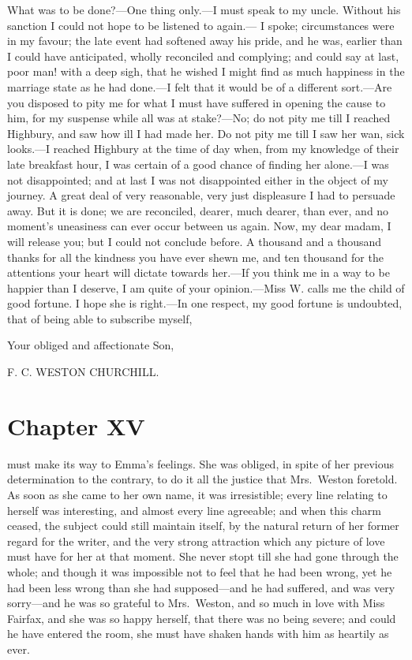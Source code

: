 What was to be done?---One thing only.---I must speak to my uncle.
Without his sanction I could not hope to be listened to again.---%
I spoke; circumstances were in my favour; the late event had softened
away his pride, and he was, earlier than I could have anticipated,
wholly reconciled and complying; and could say at last, poor man!
with a deep sigh, that he wished I might find as much happiness
in the marriage state as he had done.---I felt that it would be
of a different sort.---Are you disposed to pity me for what I must
have suffered in opening the cause to him, for my suspense while
all was at stake?---No; do not pity me till I reached Highbury,
and saw how ill I had made her.  Do not pity me till I saw her wan,
sick looks.---I reached Highbury at the time of day when, from my
knowledge of their late breakfast hour, I was certain of a good chance
of finding her alone.---I was not disappointed; and at last I was
not disappointed either in the object of my journey.  A great deal
of very reasonable, very just displeasure I had to persuade away.
But it is done; we are reconciled, dearer, much dearer, than ever,
and no moment's uneasiness can ever occur between us again.  Now, my
dear madam, I will release you; but I could not conclude before.
A thousand and a thousand thanks for all the kindness you have
ever shewn me, and ten thousand for the attentions your heart
will dictate towards her.---If you think me in a way to be happier
than I deserve, I am quite of your opinion.---Miss W. calls me
the child of good fortune.  I hope she is right.---In one respect,
my good fortune is undoubted, that of being able to subscribe
myself,

                    Your obliged and affectionate Son,

                                          F. C. WESTON CHURCHILL.



\chapter{Chapter XV}


 must make its way to Emma's feelings.  She was obliged,
in spite of her previous determination to the contrary, to do
it all the justice that Mrs.\ Weston foretold.  As soon as she
came to her own name, it was irresistible; every line relating
to herself was interesting, and almost every line agreeable;
and when this charm ceased, the subject could still maintain itself,
by the natural return of her former regard for the writer, and the
very strong attraction which any picture of love must have for her at
that moment.  She never stopt till she had gone through the whole;
and though it was impossible not to feel that he had been wrong,
yet he had been less wrong than she had supposed---and he had suffered,
and was very sorry---and he was so grateful to Mrs.\ Weston,
and so much in love with Miss Fairfax, and she was so happy herself,
that there was no being severe; and could he have entered the room,
she must have shaken hands with him as heartily as ever.

